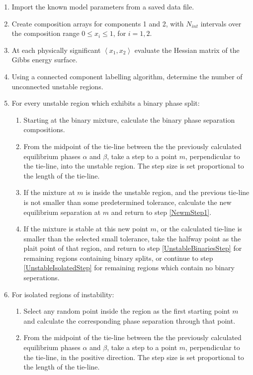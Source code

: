 \begin{enumerate}
\item Import the known model parameters from a saved data file.\
\item Create composition arrays for components 1 and 2, with $N_{int}$ intervals over the composition range $0\leq x_{i}\leq1$, for $i =1, 2$. \
\item At each physically significant $\left\langle x_{1}, x_{2}\right\rangle$ evaluate the Hessian matrix of the Gibbs energy surface.\
\item Using a connected component labelling algorithm, determine the number of unconnected unstable regions.\
\item For every unstable region which exhibits a binary phase split:\label{UnstableBinariesStep}\
\begin{enumerate}
	\item Starting at the binary mixture, calculate the binary phase separation compositions.\
	\item From the midpoint of the tie-line between the the previously calculated equilibrium phases $\alpha$ and $\beta$, take a step to a point $m$, perpendicular to the tie-line, into the unstable region. The step size is set proportional to the length of the tie-line.\label{NewmStep1}\
	\item If the mixture at $m$ is inside the unstable region, and the previous tie-line is not smaller than some predetermined tolerance, calculate the new equilibrium separation at $m$ and return to step \ref{NewmStep1}.\
	\item If the mixture is stable at this new point $m$, or the calculated tie-line is smaller than the selected small tolerance, take the halfway point as the plait point of that region, and return to step \ref{UnstableBinariesStep} for remaining regions containing binary splits, or continue to step \ref{UnstableIsolatedStep} for remaining regions which contain no binary seperations.\
\end{enumerate}
\item For isolated regions of instability:\label{UnstableIsolatedStep}\
\begin{enumerate}
	\item Select any random point inside the region as the first starting point $m$ and calculate the corresponding phase separation through that point.\
	\item From the midpoint of the tie-line between the the previously calculated equilibrium phases $\alpha$ and $\beta$, take a step to a point $m$, perpendicular to the tie-line, in the positive direction. The step size is set proportional to the length of the tie-line.\label{NewmStep2}\

\end{enumerate}
\end{enumerate}
